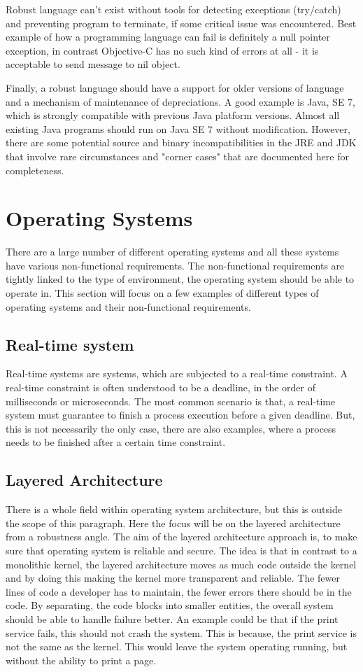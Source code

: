   Robust language can't exist without tools for detecting exceptions (try/catch) and preventing program to terminate, if some critical issue was encountered. Best example of how a programming language can fail is definitely a null pointer exception, in contrast Objective-C has no such kind of errors at all - it is acceptable to send message to nil object.

  Finally, a robust language should have a support for older versions of language and a mechanism of maintenance of depreciations. A good example is Java, SE 7, which is strongly compatible with previous Java platform versions. Almost all existing Java programs should run on Java SE 7 without modification. However, there are some  potential source and binary incompatibilities in the JRE and JDK that involve rare circumstances and "corner cases" that are documented here for completeness.\cite{huhns2002robust}

\section{Operating Systems}
  There are a large number of different operating systems and all these systems have various non-functional requirements. The non-functional requirements are tightly linked to the type of environment, the operating system should be able to operate in. This section will focus on a few examples of different types of operating systems and their non-functional requirements.

  \subsection{Real-time system}
    Real-time systems are systems, which are subjected to a real-time constraint. A real-time constraint is often understood to be a deadline, in the order of milliseconds or microseconds. The most common scenario is that, a real-time system must guarantee to finish a process execution before a given deadline. But, this is not necessarily the only case, there are also examples, where a process needs to be finished after a certain time constraint.
  
  \subsection{Layered Architecture}
    There is a whole field within operating system architecture, but this is outside the scope of this paragraph. Here the focus will be on the layered architecture from a robustness angle. The aim of the layered architecture approach is, to make sure that operating system is reliable and secure. The idea is that in contrast to a monolithic kernel, the layered architecture moves as much code outside the kernel and by doing this making the kernel more transparent and reliable. The fewer lines of code a developer has to maintain, the fewer errors there should be in the code. By separating, the code blocks into smaller entities, the overall system should be able to handle failure better. An example could be that if the print service fails, this should not crash the system. This is because, the print service is not the same as the kernel. This would leave the system operating running, but without the ability to print a page.

